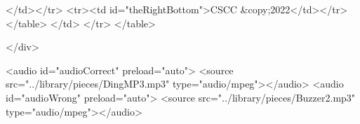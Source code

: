 \documentclass{ximera}
\begin{document}
	
	
	</td></tr>
	<tr><td id="theRightBottom">CSCC &copy;2022</td></tr>
	</table>
</td>
</tr>
</table>





</div>


<audio id="audioCorrect" preload="auto"> <source src="../library/pieces/DingMP3.mp3" type="audio/mpeg"></audio>
<audio id="audioWrong" preload="auto"> <source src="../library/pieces/Buzzer2.mp3" type="audio/mpeg"></audio>
\end{document}
